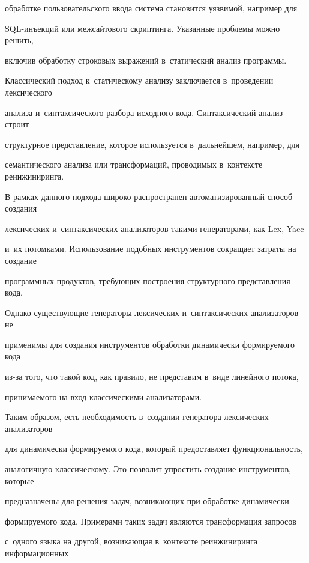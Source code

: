 обработке пользовательского ввода система становится уязвимой, например для 


SQL-инъек\-ций или межсайтового скриптинга. Указанные проблемы можно решить, 


включив обработку строковых выражений в~статический анализ программы.





Классический подход к~статическому анализу заключается в~проведении лексического 


анализа и~синтаксического разбора исходного кода. Синтаксический анализ строит 


структурное представление, которое используется в~дальнейшем, например, для 


семантического анализа или трансформаций, проводимых в~контексте реинжиниринга. 


В рамках данного подхода широко распространен автоматизированный способ создания 


лексических и~синтаксических анализаторов такими генераторами, как Lex, Yacc 


и~их потомками. Использование подобных инструментов сокращает затраты на создание 


программных продуктов, требующих построения структурного представления кода. 


Однако существующие генераторы лексических и~синтаксических анализаторов не 


применимы для создания инструментов обработки динамически формируемого кода 


из-за того, что такой код, как правило, не представим в~виде линейного потока, 


принимаемого на вход классическими анализаторами.





Таким образом, есть необходимость в~создании генератора лексических анализаторов 


для динамически формируемого кода, который предоставляет функциональность, 


аналогичную классическому. Это позволит упростить создание инструментов, которые 


предназначены для решения задач, возникающих при обработке динамически 


формируемого кода. Примерами таких задач являются трансформация запросов 


с~одного языка на другой, возникающая в~кон\-текс\-те реинжиниринга информационных 


